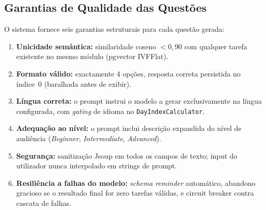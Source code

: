 \subsection{Garantias de Qualidade das Questões} \label{sec:garantias-qualidade}

O sistema fornece seis garantias estruturais para cada questão gerada:

\begin{enumerate}
    \item \textbf{Unicidade semântica:} similaridade coseno $< 0{,}90$ com qualquer tarefa existente no mesmo módulo (pgvector IVFFlat).
    \item \textbf{Formato válido:} exactamente 4 opções, resposta correta persistida no índice~0 (baralhada antes de exibir).
    \item \textbf{Língua correta:} o prompt instrui o modelo a gerar exclusivamente na língua configurada, com \textit{gating} de idioma no \texttt{DayIndexCalculator}.
    \item \textbf{Adequação ao nível:} o prompt inclui descrição expandida do nível de audiência (\textit{Beginner}, \textit{Intermediate}, \textit{Advanced}).
    \item \textbf{Segurança:} sanitização Jsoup em todos os campos de texto; input do utilizador nunca interpolado em strings de prompt.
    \item \textbf{Resiliência a falhas do modelo:} \textit{schema reminder} automático, abandono gracioso se o resultado final for zero tarefas válidas, e circuit breaker contra cascata de falhas.
\end{enumerate}
